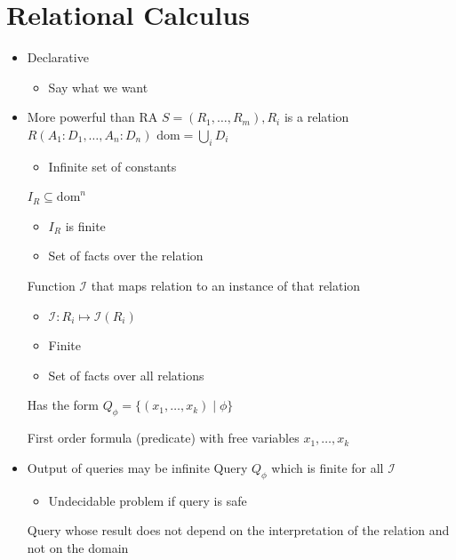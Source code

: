 \section{Relational Calculus}
\begin{itemize}
    \item Declarative
        \begin{itemize}
            \item Say what we want
        \end{itemize}
    \item More powerful than RA
     $S = (R_1, \dots, R_m), R_i$ is a relation
     $R(A_1:D_1, \dots , A_n:D_n)$
     $\text{dom} = \bigcup_i D_i$
        \begin{itemize}
            \item Infinite set of constants
        \end{itemize}
     $I_R \subseteq \text{dom}^n$
        \begin{itemize}
            \item $I_R$ is finite
            \item Set of facts over the relation
        \end{itemize}
     Function $\mathcal{I}$ that maps relation to an instance of that relation
        \begin{itemize}
            \item $\mathcal{I}: R_i \mapsto \mathcal{I}(R_i)$
            \item Finite
            \item Set of facts over all relations
        \end{itemize}
     Has the form $Q_\phi = \{(x_1, \dots, x_k) \mid \phi\}$
        \begin{itemize}
            \ides{$\mathbf{\phi}$:} First order formula (predicate) with free variables $x_1, \dots, x_k$
        \end{itemize} 
    \item Output of queries may be infinite
     Query $Q_\phi$ which is finite for all $\mathcal{I}$
        \begin{itemize}
            \item Undecidable problem if query is safe
        \end{itemize}
     Query whose result does not depend on the interpretation of the relation and not on the domain

\end{itemize}
